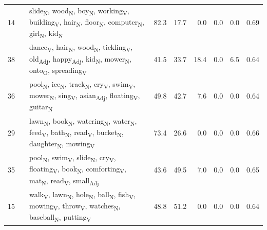 \begin{landscape}
\begin{xltabular}{\linewidth}{r >{\raggedright\arraybackslash}p{2.9cm} >{\raggedright\arraybackslash}X r r r r r r}
14 &  & slide\textsubscript{N}, wood\textsubscript{N}, boy\textsubscript{N}, working\textsubscript{V}, building\textsubscript{V}, hair\textsubscript{N}, floor\textsubscript{N}, computer\textsubscript{N}, girl\textsubscript{N}, kid\textsubscript{N} & 82.3 & 17.7 & 0.0 & 0.0 & 0.0 & 0.69 \\
38 &  & dance\textsubscript{V}, hair\textsubscript{N}, wood\textsubscript{N}, tickling\textsubscript{V}, old\textsubscript{Adj}, happy\textsubscript{Adj}, kid\textsubscript{N}, mower\textsubscript{N}, onto\textsubscript{O}, spreading\textsubscript{V} & 41.5 & 33.7 & 18.4 & 0.0 & 6.5 & 0.64 \\
36 &  & pool\textsubscript{N}, ice\textsubscript{N}, track\textsubscript{N}, cry\textsubscript{V}, swim\textsubscript{V}, mower\textsubscript{N}, sing\textsubscript{V}, asian\textsubscript{Adj}, floating\textsubscript{V}, guitar\textsubscript{N} & 49.8 & 42.7 & 7.6 & 0.0 & 0.0 & 0.64 \\
29 &  & lawn\textsubscript{N}, book\textsubscript{N}, watering\textsubscript{N}, water\textsubscript{N}, feed\textsubscript{V}, bath\textsubscript{N}, read\textsubscript{V}, bucket\textsubscript{N}, daughter\textsubscript{N}, mowing\textsubscript{V} & 73.4 & 26.6 & 0.0 & 0.0 & 0.0 & 0.66 \\
35 &  & pool\textsubscript{N}, swim\textsubscript{V}, slide\textsubscript{N}, cry\textsubscript{V}, floating\textsubscript{V}, book\textsubscript{N}, comforting\textsubscript{V}, mat\textsubscript{N}, read\textsubscript{V}, small\textsubscript{Adj} & 43.6 & 49.5 & 7.0 & 0.0 & 0.0 & 0.65 \\
15 &  & walk\textsubscript{V}, lawn\textsubscript{N}, hole\textsubscript{N}, ball\textsubscript{N}, fish\textsubscript{V}, mowing\textsubscript{V}, throw\textsubscript{V}, watches\textsubscript{N}, baseball\textsubscript{N}, putting\textsubscript{V} & 48.8 & 51.2 & 0.0 & 0.0 & 0.0 & 0.64 \\
\end{xltabular}
\end{landscape}
